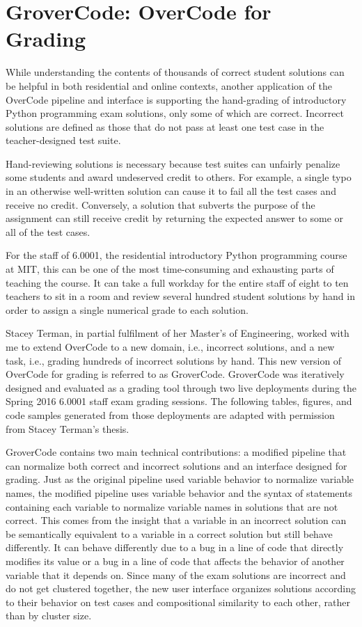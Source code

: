 \section{GroverCode: OverCode for Grading}\label{sec:grover}

While understanding the contents of thousands of correct student solutions can be helpful in both residential and online contexts, another application of the OverCode pipeline and interface is supporting the hand-grading of introductory Python programming exam solutions, only some of which are correct. Incorrect solutions are defined as those that do not pass at least one test case in the teacher-designed test suite.

Hand-reviewing solutions is necessary because test suites can unfairly penalize some students and award undeserved credit to others. For example, a single typo in an otherwise well-written solution can cause it to fail all the test cases and receive no credit. Conversely, a solution that subverts the purpose of the assignment can still receive credit by returning the expected answer to some or all of the test cases.

For the staff of 6.0001, the residential introductory Python programming course at MIT, this can be one of the most time-consuming and exhausting parts of teaching the course. It can take a full workday for the entire staff of eight to ten teachers to sit in a room and review several hundred student solutions by hand in order to assign a single numerical grade to each solution.

Stacey Terman, in partial fulfilment of her Master's of Engineering, worked with me to extend OverCode to a new domain, i.e., incorrect solutions, and a new task, i.e., grading hundreds of incorrect solutions by hand. This new version of OverCode for grading is referred to as GroverCode. GroverCode was iteratively designed and evaluated as a grading tool through two live deployments during the Spring 2016 6.0001 staff exam grading sessions. The following tables, figures, and code samples generated from those deployments are adapted with permission from Stacey Terman's thesis.

GroverCode contains two main technical contributions: a modified pipeline that can normalize both correct and incorrect solutions and an interface designed for grading. Just as the original pipeline used variable behavior to normalize variable names, the modified pipeline uses variable behavior and the syntax of statements containing each variable to normalize variable names in solutions that are not correct. This comes from the insight that a variable in an incorrect solution can be semantically equivalent to a variable in a correct solution but still behave differently. It can behave differently due to a bug in a line of code that directly modifies its value or a bug in a line of code that affects the behavior of another variable that it depends on. Since many of the exam solutions are incorrect and do not get clustered together, the new user interface organizes solutions according to their behavior on test cases and compositional similarity to each other, rather than by cluster size.

